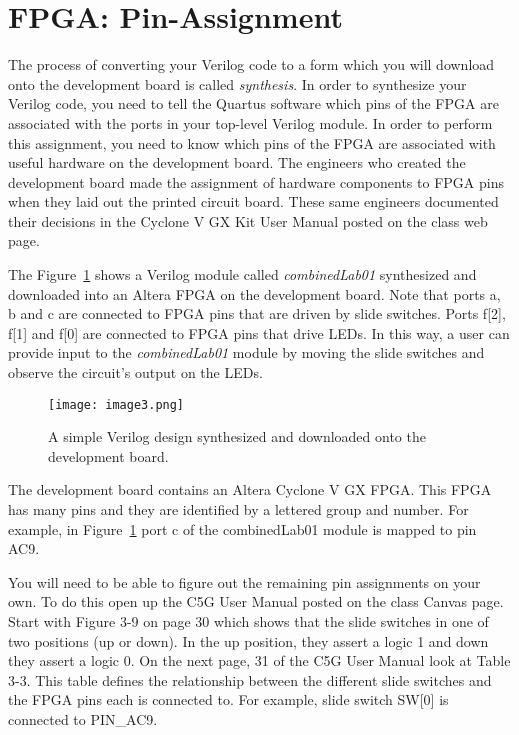 \section{FPGA: Pin-Assignment}

The process of converting your Verilog code to a form which you will
download onto the development board is called \emph{synthesis}. In order
to synthesize your Verilog code, you need to tell the Quartus software
which pins of the FPGA are associated with the ports in your top-level
Verilog module. In order to perform this assignment, you need to know
which pins of the FPGA are associated with useful hardware on the
development board. The engineers who created the development board made
the assignment of hardware components to FPGA pins when they laid out
the printed circuit board. These same engineers documented their
decisions in the Cyclone V GX Kit User Manual posted on the class web
page.

The Figure~\ref{fig:simpleVerilogDownload} shows a Verilog module called \emph{combinedLab01}
synthesized and downloaded into an Altera FPGA on the development board.
Note that ports a, b and c are connected to FPGA pins that are driven by
slide switches. Ports f{[}2{]}, f{[}1{]} and f{[}0{]} are connected to
FPGA pins that drive LEDs. In this way, a user can provide input to the
\emph{combinedLab01} module by moving the slide switches and observe the
circuit's output on the LEDs.

\begin{figure}[ht]
    \caption{A simple Verilog design synthesized and downloaded onto the development board.}
    \texttt{[image: image3.png]}
    \label{fig:simpleVerilogDownload}
\end{figure}

The development board contains an Altera Cyclone V GX FPGA. This FPGA
has many pins and they are identified by a lettered group and number.
For example, in Figure~\ref{fig:simpleVerilogDownload} port c of
the combinedLab01 module is mapped to pin AC9.

You will need to be able to figure out the remaining pin assignments on
your own. To do this open up the C5G User Manual posted on the class Canvas
page. Start with Figure 3-9 on page 30 which shows that the slide switches in one
of two positions (up or down). In the up position, they assert a logic 1 and down
they assert a logic 0.  On the next page, 31 of the C5G User Manual look
at Table 3-3. This table defines the relationship between the different slide
switches and the FPGA pins each is connected to.  For example, slide switch
SW{[}0{]} is connected to PIN\_AC9.


